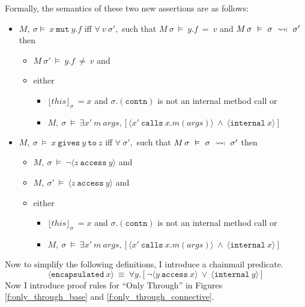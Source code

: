 \documentclass[12pt]{article}
\newcommand{\constrained}{\mathrel{\leadsto\ \!\!\!\!{\raisebox{1pt}{$\mathsmaller{\mathsmaller{\mathsmaller{\mathsmaller\rvert}}}$}}}}
\newcommand\mut[3]{#1\ \texttt{mut}\ #2.#3}
\newcommand\gives[3]{#1\ \texttt{gives}\ #2\ \texttt{to}\ #3}
\begin{document}
Formally, the semantics of these two new assertions are as follows:
\begin{itemize}
\item
$M,\ \sigma \vDash\ \mut{x}{y}{f}$ iff $\forall\ v\ \sigma',$ such that $M\ \sigma\ \vDash\ y.f\ =\ v$ and $M\, \sigma\ \vDash\ \sigma\ \constrained\ \sigma'$ then 
\begin{itemize}
\item
$M\ \sigma'\ \vDash\ y.f\ \neq\ v$ and
\item
either
\begin{itemize}
\item
$\lfloor this \rfloor_\sigma\ = x$ and $\sigma.(\texttt{contn})$  is not an internal method call or
\item
$M,\ \sigma\ \vDash\ \exists x'\ m\ args,[\langle x'\ \texttt{calls}\ x.m(args)\rangle\ \wedge\ \langle \texttt{internal}\ x\rangle]$
\end{itemize}
\end{itemize}
\item
$M,\ \sigma\ \vDash\ \gives{x}{y}{z}$ iff $\forall\ \sigma',$ such that $M\, \sigma\ \vDash\ \sigma\ \constrained\ \sigma'$ then 
\begin{itemize}
\item
$M,\ \sigma\ \vDash\ \neg\langle z\ \texttt{access}\ y  \rangle$ and
\item
$M,\ \sigma'\ \vDash\ \langle z\ \texttt{access}\ y  \rangle$ and 
\item
either
\begin{itemize}
\item
$\lfloor this \rfloor_\sigma\ = x$ and $\sigma.(\texttt{contn})$  is not an internal method call or
\item
$M,\ \sigma\ \vDash\ \exists x'\ m\ args,[\langle x'\ \texttt{calls}\ x.m(args)\rangle\ \wedge\ \langle \texttt{internal}\ x\rangle]$
\end{itemize}
\end{itemize}
\end{itemize}
Now to simplify the following definitions, I introduce a chainmail predicate.
$$\langle\texttt{encapsulated}\ x\rangle\ \equiv\ \forall y.[\neg\langle y\ \texttt{access}\ x \rangle\ \vee\ \langle\texttt{internal}\ y\rangle]$$
Now I introduce proof rules for ``Only Through'' in Figures \ref{f:only_through_base} and \ref{f:only_through_connective}. 
\end{document}
